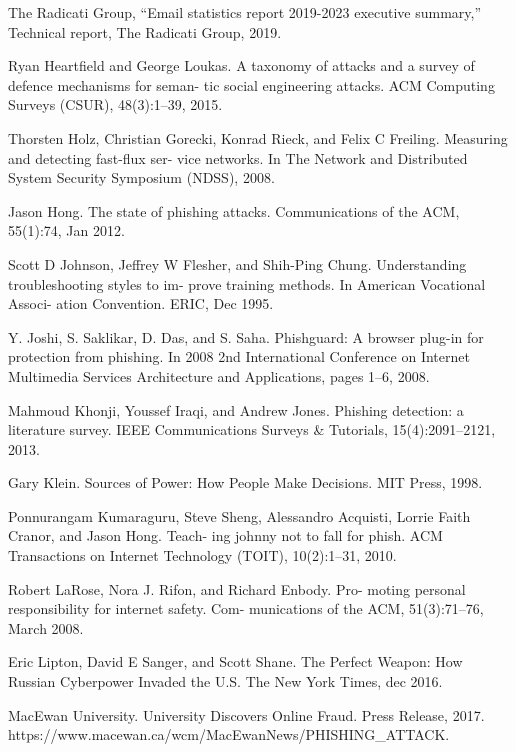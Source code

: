 \documentclass[lettersize,journal]{IEEEtran}
\begin{document}
\begin{thebibliography}{1}
  The Radicati Group, ``Email statistics report 2019-2023 executive summary,'' Technical report, The Radicati Group, 2019.

  Ryan Heartfield and George Loukas. A taxonomy of
  attacks and a survey of defence mechanisms for seman-
  tic social engineering attacks. ACM Computing Surveys
  (CSUR), 48(3):1–39, 2015.

  Thorsten Holz, Christian Gorecki, Konrad Rieck, and
  Felix C Freiling. Measuring and detecting fast-flux ser-
  vice networks. In The Network and Distributed System
  Security Symposium (NDSS), 2008.

  Jason Hong. The state of phishing attacks. Communications of the ACM, 55(1):74, Jan 2012.

  Scott D Johnson, Jeffrey W Flesher, and Shih-Ping
  Chung. Understanding troubleshooting styles to im-
  prove training methods. In American Vocational Associ-
  ation Convention. ERIC, Dec 1995.

  Y. Joshi, S. Saklikar, D. Das, and S. Saha. Phishguard:
  A browser plug-in for protection from phishing. In
  2008 2nd International Conference on Internet Multimedia Services Architecture and Applications, pages 1–6,
  2008.

  Mahmoud Khonji, Youssef Iraqi, and Andrew Jones.
  Phishing detection: a literature survey. IEEE Communications Surveys & Tutorials, 15(4):2091–2121, 2013.

  Gary Klein. Sources of Power: How People Make Decisions. MIT Press, 1998.

  Ponnurangam Kumaraguru, Steve Sheng, Alessandro
  Acquisti, Lorrie Faith Cranor, and Jason Hong. Teach-
  ing johnny not to fall for phish. ACM Transactions on
  Internet Technology (TOIT), 10(2):1–31, 2010.

  Robert LaRose, Nora J. Rifon, and Richard Enbody. Pro-
  moting personal responsibility for internet safety. Com-
  munications of the ACM, 51(3):71–76, March 2008.

  Eric Lipton, David E Sanger, and Scott Shane. The Perfect Weapon: How Russian Cyberpower Invaded the U.S. The New York Times, dec 2016.

  MacEwan University. University Discovers Online Fraud. Press Release, 2017. https://www.macewan.ca/wcm/MacEwanNews/PHISHING\_ATTACK.


\end{thebibliography}
\end{document}
